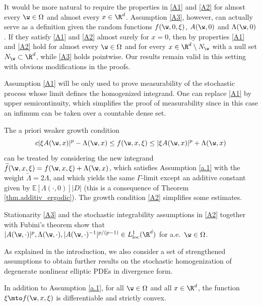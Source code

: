 \begin{remark}\label{r.on_assump}
\begin{enumeratea}
\item It would be more natural to require the properties in \eqref{A1} and \eqref{A2} for almost every $\w\in\Omega$ and almost every $x\in\R^d$. Assumption \eqref{A3}, however, can actually serve as a definition given the random functions $f(\w,0,\xi)$, $A(\w,0)$ and $\Lambda(\w,0)$. If they satisfy \eqref{A1} and \eqref{A2} almost surely for $x=0$, then by \cite[Lem.\,7.1]{JKO} properties \eqref{A1} and \eqref{A2} hold for almost every $\w\in\Omega$ and for every $x\in \R^d\setminus N_{\w}$ with a null set $N_{\w}\subset\R^d$, while \eqref{A3} holds pointwise. Our results remain valid in this setting with obvious modifications in the proofs.
\item Assumption \eqref{A1} will be only used to prove measurability of the stochastic process whose limit defines the homogenized integrand. One can replace \eqref{A1} by upper semicontinuity, which simplifies the proof of measurability since in this case an infimum can be taken over a countable dense set.
\item The a priori weaker growth condition
\begin{equation*}
c|\xi A(\w,x)|^p-\Lambda(\w,x)\leq f(\w,x,\xi)\leq |\xi A(\w,x)|^p+\Lambda(\w,x)
\end{equation*}
can be treated by considering the new integrand $\widetilde{f}(\w,x,\xi)=f(\w,x,\xi)+\Lambda(\w,x)$, which satisfies Assumption \ref{a.1} with the weight $\widetilde{\Lambda}=2\Lambda$, and which yields the same $\Gamma$-limit except an additive constant given by $\mathbb{E}[\Lambda(\cdot,0)]|D|$ (this is a consequence of Theorem \ref{thm.additiv_ergodic}). The growth condition \eqref{A2} simplifies some estimates.
\item Stationarity \eqref{A3} and the stochastic integrability assumptions in \eqref{A2} together with Fubini's theorem show that $|A(\w,\cdot)|^p,\Lambda(\w,\cdot),|A(\w,\cdot)^{-1}|^{p/(p-1)}\in L^1_\mathrm{loc}(\R^d)$ for a.e.\ $\w\in\Omega$.
\end{enumeratea}
\end{remark}
As explained in the introduction, we also consider a set of strengthened assumptions to obtain further results on the stochastic homogenization of degenerate nonlinear elliptic PDEs in divergence form.
\begin{assumption}\label{a.2}
In addition to Assumption \ref{a.1}, for all $\w\in\Omega$ and all $x\in\R^d$, the function $\xi\mto f(\w,x,\xi)$ is differentiable and strictly convex.
\end{assumption}
%
